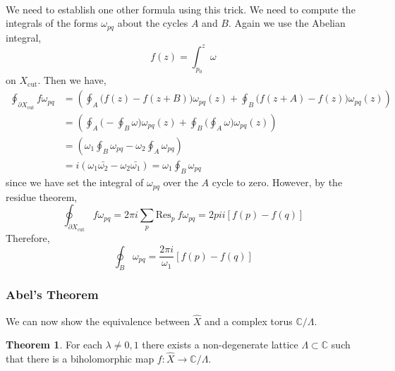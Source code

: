 \documentclass[12pt]{extarticle}
\newcommand{\C}{\mathbb{C}}
\theoremstyle{definition}
\newtheorem{theorem}{Theorem}[section]
\newcommand{\Res}[2]{\mathrm{Res}_{#1} \: #2}
\newcommand{\Xcut}{X_{\text{cut}}}
\begin{document}
\bigskip\\
We need to establish one other formula using this trick. We need to compute the integrals of the forms $\omega_{pq}$ about the cycles $A$ and $B$. Again we use the Abelian integral,
\[ f(z) = \int_{p_0}^z \omega \]
on $\Xcut$. Then we have,
\begin{align*}
\oint_{\partial \Xcut} f \omega_{pq} & = \left( \oint_A \Big( f(z)  - f(z + B) \Big) \omega_{pq}(z) + \oint_B \Big( f(z + A) - f(z) \Big) \omega_{pq}(z) \right)
\\
& = \left( \oint_A \Big( - \oint_B \omega \Big) \omega_{pq}(z) + \oint_B \Big( \oint_A \omega \Big) \omega_{pq}(z) \right)
\\
& = \left( \omega_1  \oint_B \omega_{pq}  - \omega_2 \oint_A \omega_{pq} \right)
\\
& = i \left( \omega_1 \bar{\omega_2} - \omega_2 \bar{\omega_1} \right) = \omega_1 \oint_B \omega_{pq} 
\end{align*} 
since we have set the integral of $\omega_{pq}$ over the $A$ cycle to zero. However, by the residue theorem,
\[ \oint_{\partial \Xcut} f \omega_{pq} = 2 \pi i \sum_{p} \Res{p}{f \omega_{pq}} = 2 pi i \left[ f(p) - f(q) \right] \]
Therefore, 
\[ \oint_B \omega_{pq} = \frac{2 \pi i}{\omega_1} \left[ f(p) - f(q) \right] \]

\subsubsection{Abel's Theorem}

We can now show the equivalence between $\hat{X}$ and a complex torus $\C / \Lambda$. 

\begin{theorem}
For each $\lambda \neq 0, 1$ there exists a non-degenerate lattice $\Lambda \subset \C$ such that there is a biholomorphic map $f : \hat{X} \to \C / \Lambda$. 
\end{theorem}
\end{document}

